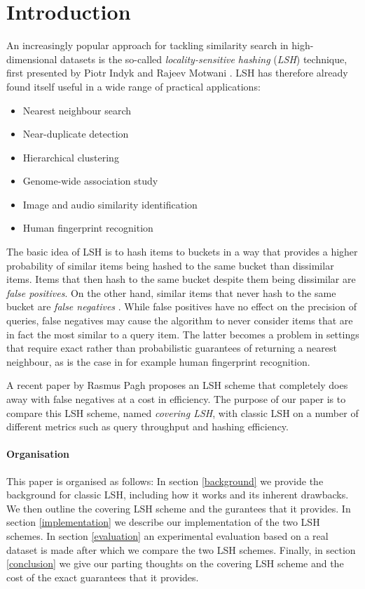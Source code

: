 \section{Introduction}
\label{introduction}

An increasingly popular approach for tackling similarity search in high-dimensional datasets is the so-called \textit{locality-sensitive hashing} (\textit{LSH}) technique, first presented by Piotr Indyk and Rajeev Motwani \cite{DBLP:conf/stoc/IndykM98}. LSH has therefore already found itself useful in a wide range of practical applications:

\begin{itemize}
  \item Nearest neighbour search
  \item Near-duplicate detection
  \item Hierarchical clustering
  \item Genome-wide association study
  \item Image and audio similarity identification
  \item Human fingerprint recognition
\end{itemize}

The basic idea of LSH is to hash items to buckets in a way that provides a higher probability of similar items being hashed to the same bucket than dissimilar items. Items that then hash to the same bucket despite them being dissimilar are \textit{false positives}. On the other hand, similar items that never hash to the same bucket are \textit{false negatives} \cite[p. 88]{DBLP:books/cu/LeskovecRU14}. While false positives have no effect on the precision of queries, false negatives may cause the algorithm to never consider items that are in fact the most similar to a query item. The latter becomes a problem in settings that require exact rather than probabilistic guarantees of returning a nearest neighbour, as is the case in for example human fingerprint recognition.

A recent paper by Rasmus Pagh \cite{DBLP:journals/corr/Pagh15} proposes an LSH scheme that completely does away with false negatives at a cost in efficiency. The purpose of our paper is to compare this LSH scheme, named \textit{covering LSH}, with classic LSH on a number of different metrics such as query throughput and hashing efficiency.

\paragraph{Organisation} This paper is organised as follows: In section \ref{background} we provide the background for classic LSH, including how it works and its inherent drawbacks. We then outline the covering LSH scheme and the gurantees that it provides. In section \ref{implementation} we describe our implementation of the two LSH schemes. In section \ref{evaluation} an experimental evaluation based on a real dataset is made after which we compare the two LSH schemes. Finally, in section \ref{conclusion} we give our parting thoughts on the covering LSH scheme and the cost of the exact guarantees that it provides.
